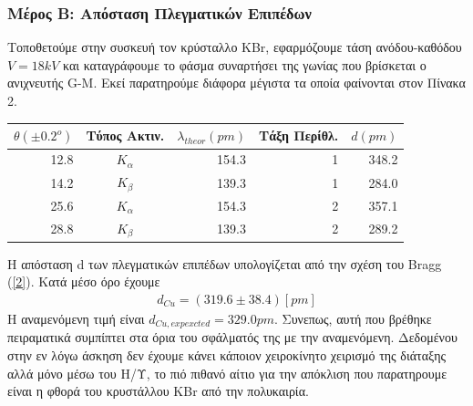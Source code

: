 \documentclass[a4paper]{article}
\begin{document}
	\subsubsection*{Μέρος Β: Απόσταση Πλεγματικών Επιπέδων}
	Τοποθετούμε στην συσκευή τον κρύσταλλο KBr, εφαρμόζουμε τάση ανόδου-καθόδου $V=18kV$ και καταγράφουμε το φάσμα συναρτήσει της γωνίας που βρίσκεται ο ανιχνευτής G-M. Εκεί παρατηρούμε διάφορα μέγιστα τα οποία φαίνονται στον Πίνακα 2.
	\begin{table}[h!]
		\centering
		\begin{tabular}{r|c|r|r|r}
			$\theta(\pm0.2^o)$ & Τύπος Ακτιν. & $\lambda_{theor}(pm)$ & Τάξη Περίθλ. & $d(pm)$ \\ 
			\hline\hline
			12.8 & $K_{\alpha}$  & 154.3 & 1 & 348.2\\
			14.2 & $K_{\beta}$ & 139.3 & 1 & 284.0\\	
			25.6 & $K_{\alpha}$  & 154.3 & 2 & 357.1\\
			28.8 & $K_{\beta}$ & 139.3 & 2 & 289.2		
		\end{tabular}
	\end{table}
	
		Η απόσταση d των πλεγματικών επιπέδων υπολογίζεται από την σχέση του Bragg (\ref{2}). Κατά μέσο όρο έχουμε 
		\begin{align*}
			d_{Cu} = (319.6 \pm 38.4) [pm]
		\end{align*}
		Η αναμενόμενη τιμή είναι $d_{Cu,expexcted}=329.0pm$. Συνεπως, αυτή που βρέθηκε πειραματικά συμπίπτει στα όρια του σφάλματός της με την αναμενόμενη. Δεδομένου στην εν λόγω άσκηση δεν έχουμε κάνει κάποιον χειροκίνητο χειρισμό της διάταξης αλλά μόνο μέσω του Η/Υ, το πιό πιθανό αίτιο για την απόκλιση που παρατηρουμε είναι η φθορά του κρυστάλλου KBr από την πολυκαιρία.
\end{document}
